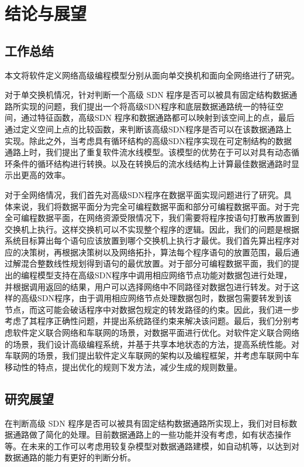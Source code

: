 \chapter{结论与展望}

\section{工作总结}

本文将软件定义网络高级编程模型分别从面向单交换机和面向全网络进行了研究。

对于单交换机情况，针对判断一个高级 SDN 程序是否可以被具有固定结构数据通路所实现的问题，我们提出一个将高级SDN程序和底层数据通路统一的特征空间，通过特征函数，高级SDN 程序和数据通路都可以映射到该空间上的点，最后通过定义空间上点的比较函数，来判断该高级SDN程序是否可以在该数据通路上实现。除此之外，当考虑具有循环结构的高级SDN程序实现在可定制结构的数据通路上时，我们提出了重复软件流水线模型。该模型的优势在于可以对具有动态循环条件的循环结构进行转换。以及在转换后的流水线结构上计算最佳数据通路时显示出更高的效率。

对于全网络情况，我们首先对高级SDN程序在数据平面实现问题进行了研究。具体来说，我们将数据平面分为完全可编程数据平面和部分可编程数据平面。对于完全可编程数据平面，在网络资源受限情况下，我们需要将程序按语句打散再放置到交换机上执行。这样交换机可以不实现整个程序的逻辑。因此，我们的问题是根据系统目标算出每个语句应该放置到哪个交换机上执行才最优。我们首先算出程序对应的决策树，再根据决策树以及网络拓扑，算法每个程序语句的放置范围，最后通过解混合整数线性规划得到语句的最优放置。对于部分可编程数据平面，我们的提出的编程模型支持在高级SDN程序中调用相应网络节点功能对数据包进行处理，并根据调用返回的结果，用户可以选择网络中不同路径对数据包进行转发。对于这样的高级SDN程序，由于调用相应网络节点处理数据包时，数据包需要转发到该节点，而这可能会破话程序中对数据包规定的转发路径的约束。因此，我们进一步考虑了其程序正确性问题，并提出系统路径约束来解决该问题。最后，我们分别考虑软件定义联合网络和车联网的场景，对数据平面进行优化。对软件定义联合网络的场景，我们设计高级编程系统，并基于共享本地状态的方法，提高系统性能。对车联网的场景，我们提出软件定义车联网的架构以及编程框架，并考虑车联网中车移动性的特点，提出优化的规则下发方法，减少生成的规则数量。


\section{研究展望}

在判断高级 SDN 程序是否可以被具有固定结构数据通路所实现上，我们对目标数据通路做了简化的处理。目前数据通路上的一些功能并没有考虑，如有状态操作等。在未来的工作可以考虑用较复杂模型对数据通路建模，如自动机等，以达到对数据通路的能力有更好的判断分析。

